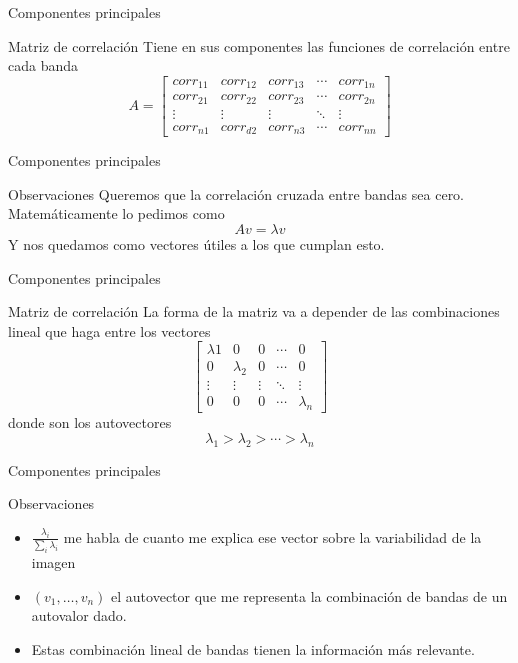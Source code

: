 \documentclass[]{beamer}
\begin{document}
\begin{frame}{Componentes principales}
  \begin{block}{Matriz de correlación}
    Tiene en sus componentes las funciones de correlación entre cada banda\pause
    \[
    A = \begin{bmatrix}
        corr_{11}       & corr_{12} & corr_{13} & \cdots & corr_{1n} \\
        corr_{21}       & corr_{22} & corr_{23} & \cdots & corr_{2n} \\
        \vdots          & \vdots    & \vdots    & \ddots & \vdots \\
        corr_{n1}       & corr_{d2} & corr_{n3} & \cdots & corr_{nn}
    \end{bmatrix} \]
  \end{block}
\end{frame}

\begin{frame}{Componentes principales}
  \begin{block}{Observaciones}
      Queremos que la correlación cruzada entre bandas sea cero.
      \pause\@ Matemáticamente lo pedimos como
        $$Av=\lambda v$$
      Y nos quedamos como vectores útiles a los que cumplan esto.
  \end{block}
\end{frame}

\begin{frame}{Componentes principales}
  \begin{block}{Matriz de correlación}
    La forma de la matriz va a depender de las combinaciones lineal que haga
      entre los vectores \pause\@
    \[\begin{bmatrix}
        \lambda{1}       & 0 & 0 & \cdots & 0 \\
        0       & \lambda_{2} & 0 & \cdots & 0 \\
        \vdots & \vdots & \vdots & \ddots & \vdots \\
        0       & 0 & 0 & \cdots & \lambda_{n}
    \end{bmatrix} \]
    \pause\@
    donde son los autovectores $$\lambda_{1}  > \lambda_{2} > \cdots > \lambda_{n}$$
  \end{block}
\end{frame}

\begin{frame}{Componentes principales}
  \begin{block}{Observaciones}
    \begin{itemize}[<+>]
      \item $\frac{\lambda_i}{\sum_i \lambda_i}$ me habla de cuanto me explica ese vector sobre la variabilidad de la imagen
      \item $(v_1 , \dots , v_n)$ el autovector que me representa la combinación de bandas de un autovalor dado.
      \item Estas combinación lineal de bandas tienen la información más relevante.
    \end{itemize}
  \end{block}
\end{frame}
\end{document}
